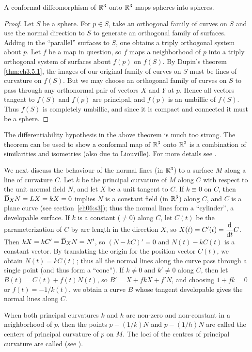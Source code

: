 \documentclass[../main]{subfiles}
\begin{document}
\begin{theorem}[Liouville] \label{thm:ch3.5.2}
A conformal diffeomorphism of $\mathbb{R}^3$ onto $\mathbb{R}^3$ maps spheres into spheres.
\end{theorem}

\begin{proof}
Let $S$ be a sphere. For $p\in S$, take an orthogonal family of curves on $S$ and use the normal direction to $S$ to generate an orthogonal family of surfaces. Adding in the ``parallel'' surfaces to $S$, one obtains a triply orthogonal system about $p$. Let $f$ be a map in question, so $f$ maps a neighborhood of $p$ into a triply orthogonal system of surfaces about $f(p)$ on $f(S)$. By Dupin's theorem \ref{thm:ch3.5.1}, the images of our original family of curves on $S$ must be lines of curvature on $f(S)$. But we may choose an orthogonal family of curves on $S$ to pass through any orthonormal pair of vectors $X$ and $Y$ at $p$. Hence all vectors tangent to $f(S)$ and $f(p)$ are principal, and $f(p)$ is an umbillic of $f(S)$. Thus $f(S)$ is completely umbillic, and since it is compact and connected it must be a sphere.
\end{proof}



The differentiability hypothesis in the above theorem is much too strong. The theorem can be used to show a conformal map of $\mathbb{R}^3$ onto $\mathbb{R}^3$ is a combination of similarities and isometries (also due to Liouville). For more details see \cite[p.225]{guggenheimer2012differential}.

We next discuss the behaviour of the normal lines (in $\mathbb{R}^3$) to a surface $M$ along a line of curvature $C$. Let $k$ be the principal curvature of $M$ along $C$ with respect to the unit normal field $N$, and let $X$ be a unit tangent to $C$. If $k \equiv 0$ on $C$, then $\covariant_X N = LX = kX = 0$ implies $N$ is a constant field (in $\mathbb{R}^3$) along $C$, and $C$ is a plane curve (see section~\ref{ch06:s3}); thus the normal lines form a ``cylinder'', a developable surface. If $k$ is a constant ($\ne 0$) along $C$, let $C(t)$ be the parameterization of $C$ by arc length in the direction $X$, so $X(t) = C'(t) = \dv{}{t}C$. Then $k X = k C' = \covariant_X N = N'$, so $(N-kC)'=0$ and $N(t)-kC(t)$ is a constant vector. By translating the origin for the position vector $C(t)$, we obtain $N(t)=kC(t)$; thus all the normal lines along the curve pass through a single point (and thus form a ``cone''). If $k \ne 0$ and $k' \ne 0$ along $C$, then let $B(t) = C(t) + f(t)N(t)$, so $B' = X + f k X + f' N$, and choosing $1 + fk = 0$ or $f(t) = -1/k(t)$, we obtain a curve $B$ whose tangent developable gives the normal lines along $C$.

When both principal curvatures $k$ and $h$ are non-zero and non-constant in a neighborhood of $p$, then the points $p - (1/k)N$ and $p - (1/h)N$ are called the centers of principal curvature of $p$ on $M$. The loci of the centres of principal curvature are called  (see \cite[p.~95]{struik1961lectures}).
\end{document}
